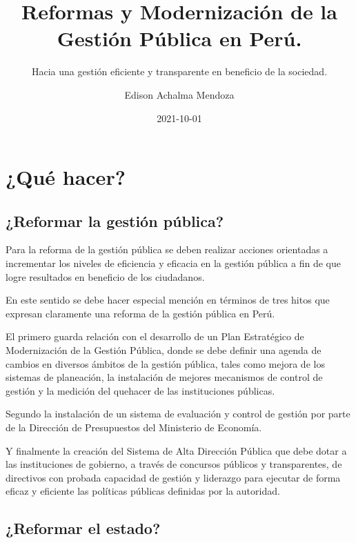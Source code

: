 \documentclass[
  letterpaper,
  DIV=11,
  numbers=noendperiod]{scrartcl}
\title{Reformas y Modernización de la Gestión Pública en Perú.}
\subtitle{Hacia una gestión eficiente y transparente en beneficio de la
sociedad.}
\author{Edison Achalma Mendoza}
\date{2021-10-01}
\begin{document}
\maketitle
\ifdefined\Shaded\renewenvironment{Shaded}{\begin{tcolorbox}[boxrule=0pt, interior hidden, frame hidden, sharp corners, borderline west={3pt}{0pt}{shadecolor}, breakable, enhanced]}{\end{tcolorbox}}\fi

\hypertarget{quuxe9-hacer}{%
\section{¿Qué hacer?}\label{quuxe9-hacer}}

\hypertarget{reformar-la-gestiuxf3n-puxfablica}{%
\subsection{¿Reformar la gestión
pública?}\label{reformar-la-gestiuxf3n-puxfablica}}

Para la reforma de la gestión pública se deben realizar acciones
orientadas a incrementar los niveles de eficiencia y eficacia en la
gestión pública a fin de que logre resultados en beneficio de los
ciudadanos.

En este sentido se debe hacer especial mención en términos de tres hitos
que expresan claramente una reforma de la gestión pública en Perú.

El primero guarda relación con el desarrollo de un Plan Estratégico de
Modernización de la Gestión Pública, donde se debe definir una agenda de
cambios en diversos ámbitos de la gestión pública, tales como mejora de
los sistemas de planeación, la instalación de mejores mecanismos de
control de gestión y la medición del quehacer de las instituciones
públicas.

Segundo la instalación de un sistema de evaluación y control de gestión
por parte de la Dirección de Presupuestos del Ministerio de Economía.

Y finalmente la creación del Sistema de Alta Dirección Pública que debe
dotar a las instituciones de gobierno, a través de concursos públicos y
transparentes, de directivos con probada capacidad de gestión y
liderazgo para ejecutar de forma eficaz y eficiente las políticas
públicas definidas por la autoridad.

\hypertarget{reformar-el-estado}{%
\subsection{¿Reformar el estado?}\label{reformar-el-estado}}
\end{document}
